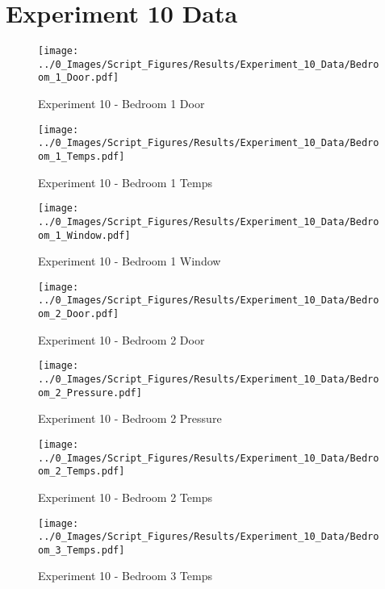 	\clearpage

\clearpage		\large
\section{Experiment 10 Data} \label{App:Exp10Results} 

	\begin{figure}[H]
		\centering
		\texttt{[image: ../0\_Images/Script\_Figures/Results/Experiment\_10\_Data/Bedroom\_1\_Door.pdf]}
		\caption[]{Experiment 10 - Bedroom 1 Door}
	\end{figure}
 

	\begin{figure}[H]
		\centering
		\texttt{[image: ../0\_Images/Script\_Figures/Results/Experiment\_10\_Data/Bedroom\_1\_Temps.pdf]}
		\caption[]{Experiment 10 - Bedroom 1 Temps}
	\end{figure}
 
	\clearpage

	\begin{figure}[H]
		\centering
		\texttt{[image: ../0\_Images/Script\_Figures/Results/Experiment\_10\_Data/Bedroom\_1\_Window.pdf]}
		\caption[]{Experiment 10 - Bedroom 1 Window}
	\end{figure}
 

	\begin{figure}[H]
		\centering
		\texttt{[image: ../0\_Images/Script\_Figures/Results/Experiment\_10\_Data/Bedroom\_2\_Door.pdf]}
		\caption[]{Experiment 10 - Bedroom 2 Door}
	\end{figure}
 
	\clearpage

	\begin{figure}[H]
		\centering
		\texttt{[image: ../0\_Images/Script\_Figures/Results/Experiment\_10\_Data/Bedroom\_2\_Pressure.pdf]}
		\caption[]{Experiment 10 - Bedroom 2 Pressure}
	\end{figure}
 

	\begin{figure}[H]
		\centering
		\texttt{[image: ../0\_Images/Script\_Figures/Results/Experiment\_10\_Data/Bedroom\_2\_Temps.pdf]}
		\caption[]{Experiment 10 - Bedroom 2 Temps}
	\end{figure}
 
	\clearpage

	\begin{figure}[H]
		\centering
		\texttt{[image: ../0\_Images/Script\_Figures/Results/Experiment\_10\_Data/Bedroom\_3\_Temps.pdf]}
		\caption[]{Experiment 10 - Bedroom 3 Temps}
	\end{figure}
 

